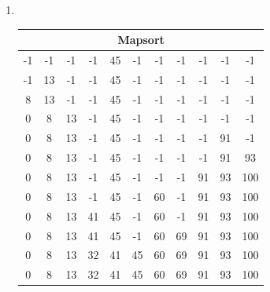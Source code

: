 \documentclass[11pt,a4paper]{article}
\begin{document}
\begin{loesung}
    \begin{enumerate}
        \item \ \\
        \begin{table}[h!]
            \centering
            \begin{tabular}{|ccccccccccc|}
                \hline \multicolumn{11}{|c|}{\textbf{Mapsort}} \\ \hline
                -1 & -1 & -1 & -1 & 45 & -1 & -1 & -1 & -1 & -1 & -1 \\ \hline
                -1 & 13 & -1 & -1 & 45 & -1 & -1 & -1 & -1 & -1 & -1 \\ \hline
                8 & 13 & -1 & -1 & 45 & -1 & -1 & -1 & -1 & -1 & -1 \\ \hline
                0 & 8 & 13 & -1 & 45 & -1 & -1 & -1 & -1 & -1 & -1 \\ \hline
                0 & 8 & 13 & -1 & 45 & -1 & -1 & -1 & -1 & 91 & -1 \\ \hline
                0 & 8 & 13 & -1 & 45 & -1 & -1 & -1 & -1 & 91 & 93 \\ \hline
                0 & 8 & 13 & -1 & 45 & -1 & -1 & -1 & 91 & 93 & 100 \\ \hline
                0 & 8 & 13 & -1 & 45 & -1 & 60 & -1 & 91 & 93 & 100 \\ \hline
                0 & 8 & 13 & 41 & 45 & -1 & 60 & -1 & 91 & 93 & 100 \\ \hline
                0 & 8 & 13 & 41 & 45 & -1 & 60 & 69 & 91 & 93 & 100 \\ \hline
                0 & 8 & 13 & 32 & 41 & 45 & 60 & 69 & 91 & 93 & 100 \\ \hline
                0 & 8 & 13 & 32 & 41 & 45 & 60 & 69 & 91 & 93 & 100 \\ \hline
            \end{tabular}
        \end{table}
        \FloatBarrier


\end{enumerate}
\end{loesung}
\end{document}
